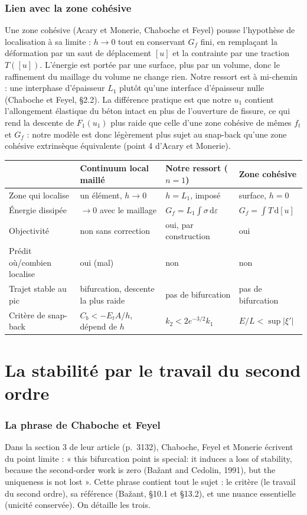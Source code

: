 \documentclass[11pt,a4paper]{article}
\newcommand{\dd}{\mathrm{d}}
\begin{document}
\section{Lien avec la zone cohésive}
Une zone cohésive (Acary et Monerie, Chaboche et Feyel) pousse l'hypothèse de localisation à
sa limite : $h \to 0$ tout en conservant $G_f$ fini, en remplaçant la déformation par un saut
de déplacement $[u]$ et la contrainte par une traction $T([u])$. L'énergie est portée par une
surface, plus par un volume, donc le raffinement du maillage du volume ne change rien. Notre
ressort est à mi-chemin : une interphase d'épaisseur $L_1$ plutôt qu'une interface
d'épaisseur nulle (Chaboche et Feyel, §2.2). La différence pratique est que notre $u_1$
contient l'allongement élastique du béton intact en plus de l'ouverture de fissure, ce qui
rend la descente de $F_1(u_1)$ plus raide que celle d'une zone cohésive de mêmes $f_t$ et $G_f$ :
notre modèle est donc légèrement plus sujet au snap-back qu'une zone cohésive extrinsèque
équivalente (point 4 d'Acary et Monerie).

\begin{center}
\begin{tabular}{@{}p{3.4cm}p{3.6cm}p{3.6cm}p{3.6cm}@{}}
\toprule
 & Continuum local maillé & Notre ressort ($n = 1$) & Zone cohésive\\
\midrule
Zone qui localise & un élément, $h\to0$ & $h = L_1$, imposé & surface, $h = 0$\\
Énergie dissipée & $\to 0$ avec le maillage & $G_f = L_1\int\sigma\,\dd\varepsilon$ & $G_f = \int T\,\dd[u]$\\
Objectivité & non sans correction & oui, par construction & oui\\
Prédit où/combien localise & oui (mal) & non & non\\
Trajet stable au pic & bifurcation, descente la plus raide & pas de bifurcation & pas de bifurcation\\
Critère de snap-back & $C_b < -E_tA/h$, dépend de $h$ & $k_2 < 2e^{-3/2}k_1$ & $E/L < \sup|\xi'|$\\
\bottomrule
\end{tabular}
\end{center}

\part{La stabilité par le travail du second ordre}

\section{La phrase de Chaboche et Feyel}
Dans la section 3 de leur article (p.~3132), Chaboche, Feyel et Monerie écrivent du point
limite : « this bifurcation point is special: it induces a loss of stability, because the
second-order work is zero (Bažant and Cedolin, 1991), but the uniqueness is not lost ». Cette
phrase contient tout le sujet : le critère (le travail du second ordre), sa référence
(Bažant, §10.1 et §13.2), et une nuance essentielle (unicité conservée). On détaille les trois.
\end{document}
